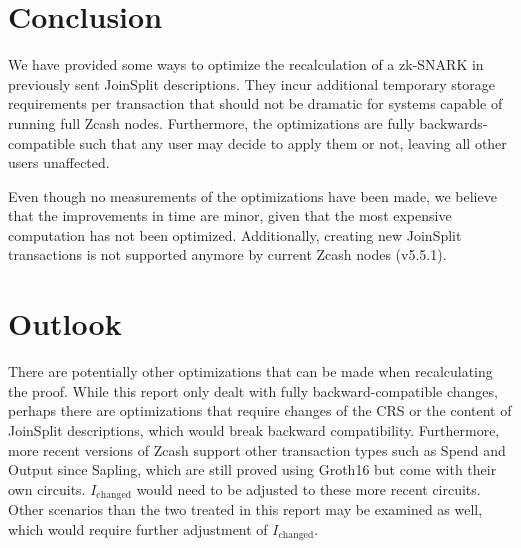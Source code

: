 \documentclass{article}
\begin{document}
\section{Conclusion} \label{sec:conclusion}

We have provided some ways to optimize the recalculation of a zk-SNARK in previously sent JoinSplit descriptions.
They incur additional temporary storage requirements per transaction that should not be dramatic for systems capable of running full Zcash nodes.
Furthermore, the optimizations are fully backwards-compatible such that any user may decide to apply them or not, leaving all other users unaffected.

Even though no measurements of the optimizations have been made, we believe that the improvements in time are minor, given that the most expensive
computation has not been optimized.
Additionally, creating new JoinSplit transactions is not supported anymore by current Zcash nodes (v5.5.1).

\section{Outlook} \label{sec:future}

There are potentially other optimizations that can be made when recalculating the proof.
While this report only dealt with fully backward-compatible changes, perhaps there are optimizations that require changes of the CRS or the content of JoinSplit descriptions, which would break backward compatibility.
Furthermore, more recent versions of Zcash support other transaction types such as Spend and Output since Sapling, which are still proved using Groth16 but come with their own circuits.
$I_\text{changed}$ would need to be adjusted to these more recent circuits.
Other scenarios than the two treated in this report may be examined as well, which would require further adjustment of $I_\text{changed}$.
\end{document}
